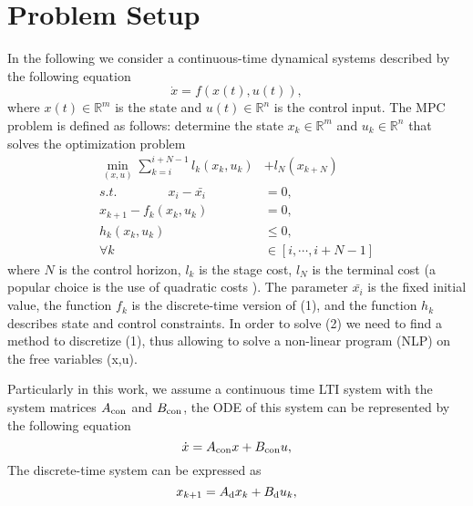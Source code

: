 \section{Problem Setup}
In the following we consider a continuous-time dynamical systems described by the following equation
\begin{equation}
	\dot{x} = f(x(t),u(t)),
\end{equation}
where $x(t)\in\mathbb{R}^m $ is the state and $u(t)\in\mathbb{R}^n$ is the control input.
The MPC problem is defined as follows: determine the state $x_k \in \mathbb{R}^m$ and $u_k \in \mathbb{R}^n$ that solves the optimization problem
\begin{equation}
	\begin{split}
	    \min \limits_{(x,u)} \sum_{k=i}^{i+N-1} l_k(x_k,u_k) &+ l_N(x_{k+N})\\
	    s.t. \qquad \qquad  x_i - \bar{x_i} &= 0,\\
	                x_{k+1}-f_k(x_k,u_k) &= 0,\\
	                h_k(x_k,u_k)  &\leq 0,\\
	                \forall k &\in [i, \cdots, i + N-1]   
	\end{split}
\end{equation}
where $N$ is the control horizon, $l_k$ is the stage cost, $l_N$ is the terminal cost (a popular choice is the use of quadratic costs \cite{maciejowski2002predictive}). The parameter $\bar{x_i}$ is the fixed initial value, the function $f_k$ is the discrete-time version of (1), and the function $h_k$ describes state and control constraints. In order to solve (2) we need to find a method to discretize (1), thus allowing to solve a non-linear program (NLP) on the free variables (x,u).

Particularly in this work, we assume a continuous time LTI system with the system matrices $A_{\rm {con}}$ and $B_{\rm {con}}$, the ODE of this system can be represented by the following equation
\begin{equation}
	\dot{x} = A_{\rm {con}}x + B_{\rm {con}}u,
	\label{eq:ode}
\end{equation}
The discrete-time system can be expressed as
\begin{equation}
	x_{k+1} = A_{\rm{d}}x_k + B_{\rm{d}}u_k,
\end{equation}

